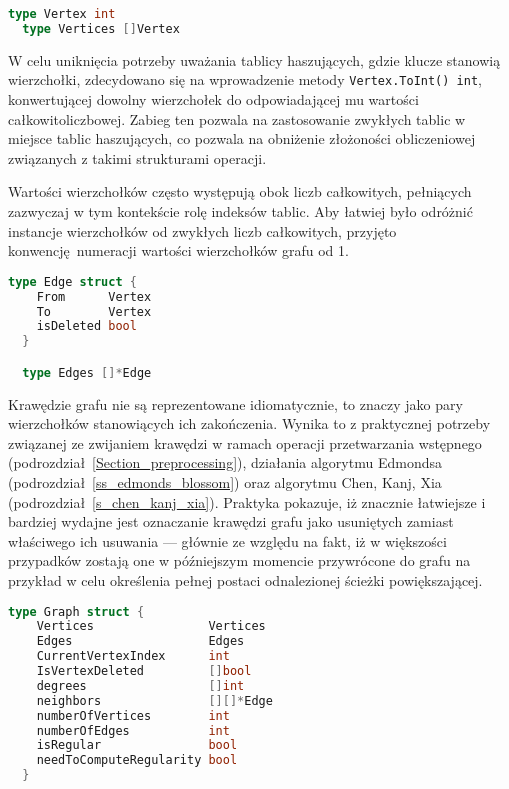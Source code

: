 \par{
  \begin{lstlisting}[language=go, caption=Typy reprezentujące wierzchołki grafu.]
  type Vertex int
  type Vertices []Vertex
  \end{lstlisting}
  W celu uniknięcia potrzeby uważania tablicy haszujących, gdzie klucze stanowią wierzchołki, zdecydowano się na wprowadzenie metody \texttt{Vertex.ToInt() int}, konwertującej dowolny wierzchołek do odpowiadającej mu wartości całkowitoliczbowej.
  Zabieg ten pozwala na zastosowanie zwykłych tablic w miejsce tablic haszujących, co pozwala na obniżenie złożoności obliczeniowej związanych z takimi strukturami operacji.

  Wartości wierzchołków często występują obok liczb całkowitych, pełniących zazwyczaj w tym kontekście rolę indeksów tablic.
  Aby łatwiej było odróżnić instancje wierzchołków od zwykłych liczb całkowitych, przyjęto konwencję numeracji wartości wierzchołków grafu od 1.
  \begin{lstlisting}[language=go, caption=Typy reprezentujące krawędzie grafu.]
  type Edge struct {
    From      Vertex
    To        Vertex
    isDeleted bool
  }

  type Edges []*Edge
  \end{lstlisting}

  Krawędzie grafu nie są reprezentowane idiomatycznie, to znaczy jako pary wierzchołków stanowiących ich zakończenia.
  Wynika to z praktycznej potrzeby związanej ze zwijaniem krawędzi w ramach operacji przetwarzania wstępnego (podrozdział~\ref{Section_preprocessing}), działania algorytmu Edmondsa (podrozdział~\ref{ss_edmonds_blossom}) oraz algorytmu Chen, Kanj, Xia (podrozdział~\ref{s_chen_kanj_xia}).
  Praktyka pokazuje, iż znacznie łatwiejsze i bardziej wydajne jest oznaczanie krawędzi grafu jako usuniętych zamiast właściwego ich usuwania --- głównie ze względu na fakt, iż w większości przypadków zostają one w późniejszym momencie przywrócone do grafu na przykład w celu określenia pełnej postaci odnalezionej ścieżki powiększającej.

  \begin{lstlisting}[language=go, caption=Struktura reprezentująca graf.]
  type Graph struct {
    Vertices                Vertices
    Edges                   Edges
    CurrentVertexIndex      int
    IsVertexDeleted         []bool
    degrees                 []int
    neighbors               [][]*Edge
    numberOfVertices        int
    numberOfEdges           int
    isRegular               bool
    needToComputeRegularity bool
  }
  \end{lstlisting}

}
